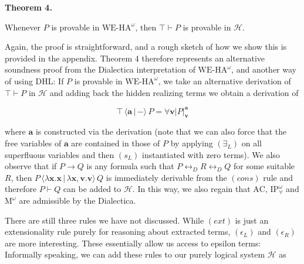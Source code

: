 \par\medskip\noindent\textbf{Theorem 4.}\par
 
 
Whenever $P$ is provable in $\mathrm{WE}\mbox{-}\mathrm{HA}^{\omega}$, then $\top\vdash P$ is provable in $\mathcal{H}$.\par
 
 
 
 
Again, the proof is straightforward, and a rough sketch of how we show this is provided in the appendix. Theorem 4 therefore represents an alternative soundness proof from the Dialectica interpretation of $\mathrm{WE}\mbox{-}\mathrm{HA}^{\omega}$, and another way of using $\mathrm{DHL}$: If $P$ is provable in $\mathrm{WE}\mbox{-}\mathrm{HA}^{\omega}$, we take an alternative derivation of $\top\vdash P$ in $\mathcal{H}$ and adding back the hidden realizing terms we obtain a derivation of\par
  
\par  \quad  \[{\top}\,{\langle{\bm{a}}\,|\,{-}\rangle}\,{P}=\forall\bm{v}|{P}|^{\bm{a}}_{\bm{v}}\]\quad  \quad  
  
where $\bm{a}$ is constructed via the derivation (note that we can also force that the free variables of $\bm{a}$ are contained in those of $P$ by applying $(\exists_{L})$ on all superfluous variables and then $(s_{L})$ instantiated with zero terms). We also observe that if $P\to Q$ is any formula such that $P\leftrightarrow_{D}R\leftrightarrow_{D}Q$ for some suitable $R$, then ${P}\,{\langle{\lambda\bm{x}.\bm{x}}\,|\,{\lambda\bm{x},\bm{v}.\bm{v}}\rangle}\,{Q}$ is immediately derivable from the $(cons)$ rule and therefore $P\vdash Q$ can be added to $\mathcal{H}$. In this way, we also regain that $\mathrm{AC}$, $\mathrm{IP}^{\omega}_{\forall}$ and $\mathrm{M}^{\omega}$ are admissible by the Dialectica.\par
 
 
 
There are still three rules we have not discussed. While $(ext)$ is just an extensionality rule purely for reasoning about extracted terms, $(\epsilon_{L})$ and $(\epsilon_{R})$ are more interesting. These essentially allow us access to epsilon terms: Informally speaking, we can add these rules to our purely logical system $\mathcal{H}$ as\par
 
